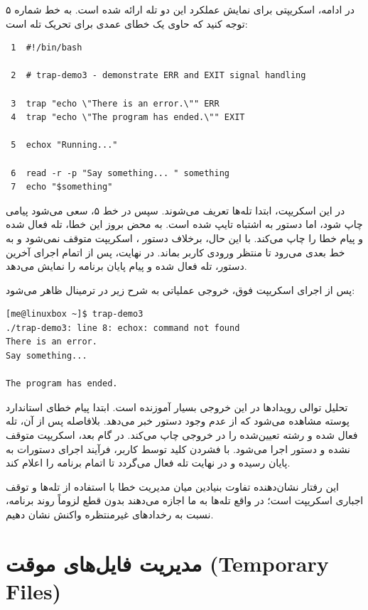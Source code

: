 در ادامه، اسکریپتی برای نمایش عملکرد این دو تله ارائه شده است. به خط شماره ۵ توجه کنید که حاوی یک خطای عمدی برای تحریک تله است:

\begin{latin}
\begin{lstlisting}
 1  #!/bin/bash

 2  # trap-demo3 - demonstrate ERR and EXIT signal handling

 3  trap "echo \"There is an error.\"" ERR
 4  trap "echo \"The program has ended.\"" EXIT

 5  echox "Running..."

 6  read -r -p "Say something... " something
 7  echo "$something"
\end{lstlisting}
\end{latin}

در این اسکریپت، ابتدا تله‌ها تعریف می‌شوند. سپس در خط ۵، سعی می‌شود پیامی چاپ شود، اما دستور  به اشتباه  تایپ شده است. به محض بروز این خطا، تله  فعال شده و پیام خطا را چاپ می‌کند. با این حال، برخلاف دستور ، اسکریپت متوقف نمی‌شود و به خط بعدی می‌رود تا منتظر ورودی کاربر بماند. در نهایت، پس از اتمام اجرای آخرین دستور، تله  فعال شده و پیام پایان برنامه را نمایش می‌دهد.

پس از اجرای اسکریپت فوق، خروجی عملیاتی به شرح زیر در ترمینال ظاهر می‌شود:

\begin{latin}
\begin{lstlisting}
[me@linuxbox ~]$ trap-demo3
./trap-demo3: line 8: echox: command not found
There is an error.
Say something...

The program has ended.
\end{lstlisting}
\end{latin}

تحلیل توالی رویدادها در این خروجی بسیار آموزنده است. ابتدا پیام خطای استاندارد پوسته مشاهده می‌شود که از عدم وجود دستور  خبر می‌دهد. بلافاصله پس از آن، تله  فعال شده و رشته تعیین‌شده را در خروجی چاپ می‌کند. در گام بعد، اسکریپت متوقف نشده و دستور  اجرا می‌شود. با فشردن کلید  توسط کاربر، فرآیند اجرای دستورات به پایان رسیده و در نهایت تله  فعال می‌گردد تا اتمام برنامه را اعلام کند.

این رفتار نشان‌دهنده تفاوت بنیادین میان مدیریت خطا با استفاده از تله‌ها و توقف اجباری اسکریپت است؛ در واقع تله‌ها به ما اجازه می‌دهند بدون قطع لزوماً روند برنامه، نسبت به رخدادهای غیرمنتظره واکنش نشان دهیم.

\section{مدیریت فایل‌های موقت (Temporary Files)}

